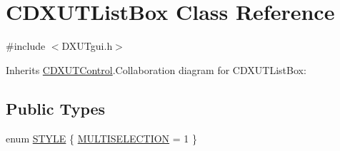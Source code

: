 \hypertarget{class_c_d_x_u_t_list_box}{
\section{CDXUTListBox Class Reference}
\label{class_c_d_x_u_t_list_box}
}


{\ttfamily \#include $<$DXUTgui.h$>$}

Inherits \hyperlink{class_c_d_x_u_t_control}{CDXUTControl}.Collaboration diagram for CDXUTListBox:\subsection*{Public Types}
\begin{DoxyCompactItemize}
\item 
enum \hyperlink{class_c_d_x_u_t_list_box_a92ad351d00e5669e6663418d1e959692}{STYLE} \{ \hyperlink{class_c_d_x_u_t_list_box_a92ad351d00e5669e6663418d1e959692a78abef1cd19ad444bb04c015c42d270d}{MULTISELECTION} =  1
 \}
\end{DoxyCompactItemize}
